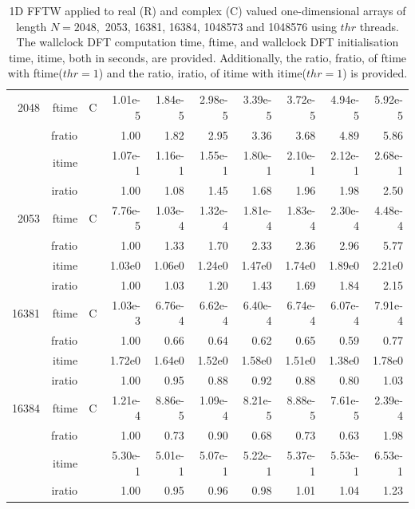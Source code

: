 \documentclass[a4paper]{article}
\begin{document}
\begin{table}
\begin{center}
\begin{tabular}{|r|r|r|r|r|r|r|r|r|r|}
    2048  & ftime & C  &  1.01e-5 &   1.84e-5 &   2.98e-5 &   3.39e-5 &   3.72e-5 &   4.94e-5 &   5.92e-5   \\ 
      & fratio & &  1.00 &   1.82 &   2.95 &   3.36 &   3.68 &   4.89 &   5.86  \\ 
     & itime & &   1.07e-1 &   1.16e-1 &   1.55e-1 &   1.80e-1 &   2.10e-1 &   2.12e-1 &   2.68e-1   \\ 
     & iratio & &  1.00 &   1.08 &   1.45 &   1.68 &   1.96 &   1.98 &   2.50     \\ \hline 
    2053  & ftime & C &  7.76e-5 &   1.03e-4 &   1.32e-4 &   1.81e-4 &   1.83e-4 &   2.30e-4 &   4.48e-4     \\ 
      & fratio & &  1.00 &   1.33 &   1.70 &   2.33 &   2.36 &   2.96 &   5.77   \\ 
     & itime &  &  1.03e0 &   1.06e0 &   1.24e0 &   1.47e0 &   1.74e0 &   1.89e0 &   2.21e0    \\ 
    & iratio &  &  1.00 &   1.03 &   1.20 &   1.43 &   1.69 &   1.84 &   2.15       \\ \hline
  16381  & ftime & C &   1.03e-3 &   6.76e-4 &   6.62e-4 &   6.40e-4 &   6.74e-4 &   6.07e-4 &   7.91e-4     \\ 
      & fratio & &  1.00 &   0.66 &  0.64 &   0.62 &  0.65 &   0.59 &  0.77   \\ 
     & itime & &   1.72e0 &   1.64e0 &   1.52e0 &   1.58e0 &   1.51e0 &   1.38e0 &   1.78e0    \\ 
     & iratio & &   1.00 &   0.95 &  0.88 &  0.92 &  0.88 &  0.80 &  1.03    \\ \hline
 16384  & ftime & C &  1.21e-4 &   8.86e-5 &   1.09e-4 &   8.21e-5 &   8.88e-5 &   7.61e-5 &   2.39e-4  \\ 
      & fratio & & 1.00 &   0.73 &  0.90 &  0.68 &  0.73 &  0.63 &  1.98  \\
     & itime & &  5.30e-1 &   5.01e-1 &   5.07e-1 &   5.22e-1 &   5.37e-1 &   5.53e-1 &   6.53e-1   \\ 
 & iratio & &  1.00 &   0.95 &  0.96 &  0.98 &  1.01 &   1.04 &   1.23  \\  \hline 
\end{tabular}
\caption{1D FFTW applied to real (R) and complex (C) valued one-dimensional arrays of length $N=2048,$ 2053, 16381, 16384, 1048573 and 1048576 using $thr$ threads. The wallclock DFT computation time, ftime, and wallclock DFT initialisation time, itime, both in seconds, are provided. Additionally,  the ratio, fratio, of ftime  with ftime($thr=1$) and the ratio, iratio, of itime  with itime($thr=1$) is provided. }\label{Tbl:FFTW1d}
\end{center}
\end{table}
\end{document}
